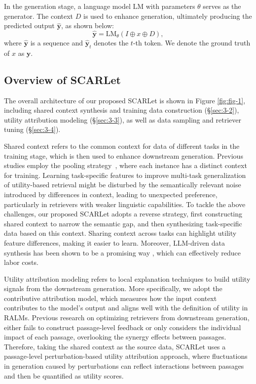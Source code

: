 \documentclass[11pt]{article}
\begin{document}
In the generation stage, a language model $\mathrm{LM}$ with parameters $\theta$ serves as the generator. The context $D$ is used to enhance generation, ultimately producing the predicted output $\mathbf{\hat{y}}$, as shown below:
\begin{equation}
    \mathbf{\hat{y}} =\mathrm{LM}_{\theta }\left (I \oplus x \oplus D \right ) ,
\end{equation}
where $\mathbf{\hat{y}}$ is a sequence and $\mathbf{\hat{y}}_t$ denotes the $t$-th token. We denote the ground truth of $x$ as $\mathbf{y}$.

\subsection{Overview of SCARLet}

The overall architecture of our proposed SCARLet is shown in Figure \ref{fig:fig-1}, including shared context synthesis and training data construction (\S \ref{sec:3-2}), utility attribution modeling (\S \ref{sec:3-3}), as well as data sampling and retriever tuning (\S \ref{sec:3-4}).


Shared context refers to the common context for data of different tasks in the training stage, which is then used to enhance downstream generation. Previous studies employ the pooling strategy~\citep{lin2024raditretrievalaugmenteddualinstruction, stochasticrag}, where each instance has a distinct context for training. Learning task-specific features to improve multi-task generalization of utility-based retrieval might be disturbed by the semantically relevant noise introduced by differences in context, leading to unexpected preference, particularly in retrievers with weaker linguistic capabilities. To tackle the above challenges, our proposed SCARLet adopts a reverse strategy, first constructing shared context to narrow the semantic gap, and then synthesizing task-specific data based on this context. Sharing context across tasks can highlight utility feature differences, making it easier to learn. Moreover, LLM-driven data synthesis has been shown to be a promising way \citep{long2024llmsdrivensyntheticdatageneration,kim2025syntrievertrainretrieversynthetic}, which can effectively reduce labor costs.





Utility attribution modeling refers to local explanation techniques to build utility signals from the downstream generation. More specifically, we adopt the contributive attribution model, which measures how the input context contributes to the model's output and aligns well with the definition of utility in RALMs. Previous research on optimizing retrievers from downstream generation, either fails to construct passage-level feedback or only considers the individual impact of each passage, overlooking the synergy effects between passages. Therefore, taking the shared context as the source data, SCARLet uses a passage-level perturbation-based utility attribution approach, where fluctuations in generation caused by perturbations can reflect interactions between passages and then be quantified as utility scores.
\end{document}
